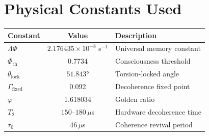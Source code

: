 \documentclass[12pt,letterpaper]{article}
\begin{document}
\appendix
\section{Physical Constants Used}

\begin{table}[h]
\centering
\begin{tabular}{lcl}
\toprule
\textbf{Constant} & \textbf{Value} & \textbf{Description} \\
\midrule
$\Lambda\Phi$ & $2.176435 \times 10^{-8}$ s$^{-1}$ & Universal memory constant \\
$\Phi_{\text{th}}$ & 0.7734 & Consciousness threshold \\
$\theta_{\text{lock}}$ & $51.843°$ & Torsion-locked angle \\
$\Gamma_{\text{fixed}}$ & 0.092 & Decoherence fixed point \\
$\varphi$ & 1.618034 & Golden ratio \\
$T_2$ & $150$--$180\,\mu$s & Hardware decoherence time \\
$\tau_0$ & $46\,\mu$s & Coherence revival period \\
\bottomrule
\end{tabular}
\end{table}
\end{document}
